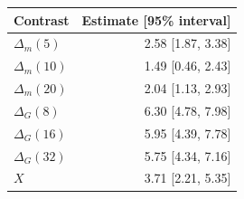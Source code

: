 \begin{tabular}{@{}lr@{}}
\toprule
Contrast & Estimate [95\% interval] \\
\midrule
$\Delta_m(5)$ & 2.58 [1.87, 3.38] \\
$\Delta_m(10)$ & 1.49 [0.46, 2.43] \\
$\Delta_m(20)$ & 2.04 [1.13, 2.93] \\
$\Delta_G(8)$ & 6.30 [4.78, 7.98] \\
$\Delta_G(16)$ & 5.95 [4.39, 7.78] \\
$\Delta_G(32)$ & 5.75 [4.34, 7.16] \\
$X$ & 3.71 [2.21, 5.35] \\
\bottomrule
\end{tabular}

